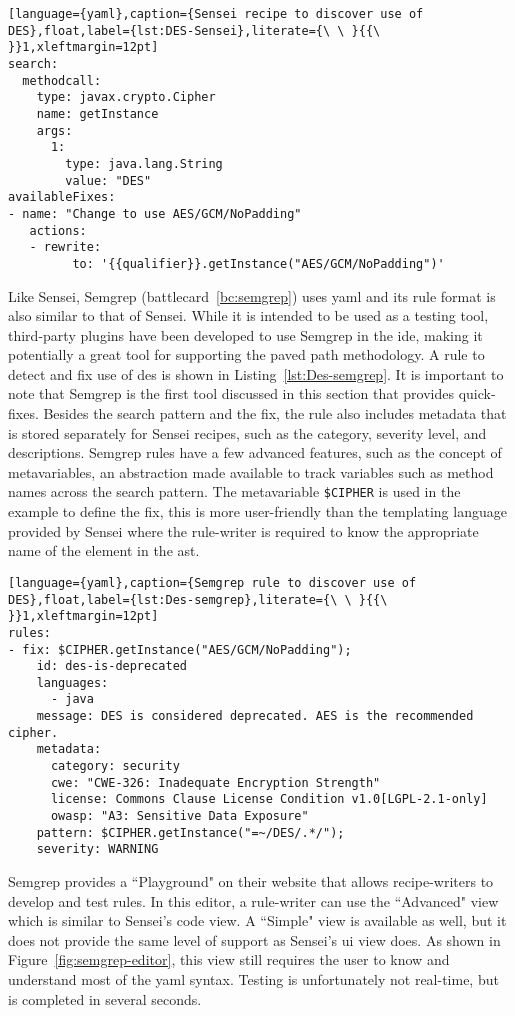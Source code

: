 \begin{lstlisting}[language={yaml},caption={Sensei recipe to discover use of DES},float,label={lst:DES-Sensei},literate={\ \ }{{\ }}1,xleftmargin=12pt]
search:
  methodcall:
    type: javax.crypto.Cipher
    name: getInstance
    args:
      1:
        type: java.lang.String
        value: "DES"
availableFixes:
- name: "Change to use AES/GCM/NoPadding"
   actions:
   - rewrite:
         to: '{{qualifier}}.getInstance("AES/GCM/NoPadding")'
\end{lstlisting}

Like Sensei, Semgrep (battlecard~\ref{bc:semgrep}) uses \gls{yaml} and its rule format is also similar to that of Sensei.
While it is intended to be used as a testing tool, third-party plugins have been developed to use Semgrep in the \gls{ide}, making it potentially a great tool for supporting the paved path methodology.
A rule to detect and fix use of \gls{des} is shown in Listing~\ref{lst:Des-semgrep}.
It is important to note that Semgrep is the first tool discussed in this section that provides quick-fixes.
Besides the search pattern and the fix, the rule also includes metadata that is stored separately for Sensei recipes, such as the category, severity level, and descriptions.
Semgrep rules have a few advanced features, such as the concept of metavariables, an abstraction made available to track variables such as method names across the search pattern.
The metavariable \texttt{\$CIPHER} is used in the example to define the fix, this is more user-friendly than the templating language provided by Sensei where the rule-writer is required to know the appropriate name of the element in the \gls{ast}.

\begin{lstlisting}[language={yaml},caption={Semgrep rule to discover use of DES},float,label={lst:Des-semgrep},literate={\ \ }{{\ }}1,xleftmargin=12pt]
rules:
- fix: $CIPHER.getInstance("AES/GCM/NoPadding");
    id: des-is-deprecated
    languages:
      - java
    message: DES is considered deprecated. AES is the recommended cipher.
    metadata:
      category: security
      cwe: "CWE-326: Inadequate Encryption Strength"
      license: Commons Clause License Condition v1.0[LGPL-2.1-only]
      owasp: "A3: Sensitive Data Exposure"
    pattern: $CIPHER.getInstance("=~/DES/.*/");
    severity: WARNING
\end{lstlisting}

Semgrep provides a ``Playground" on their website that allows recipe-writers to develop and test rules.
In this editor, a rule-writer can use the ``Advanced" view which is similar to Sensei's code view.
A ``Simple" view is available as well, but it does not provide the same level of support as Sensei's \gls{ui} view does.
As shown in Figure~\ref{fig:semgrep-editor}, this view still requires the user to know and understand most of the \gls{yaml} syntax.
Testing is unfortunately not real-time, but is completed in several seconds.

